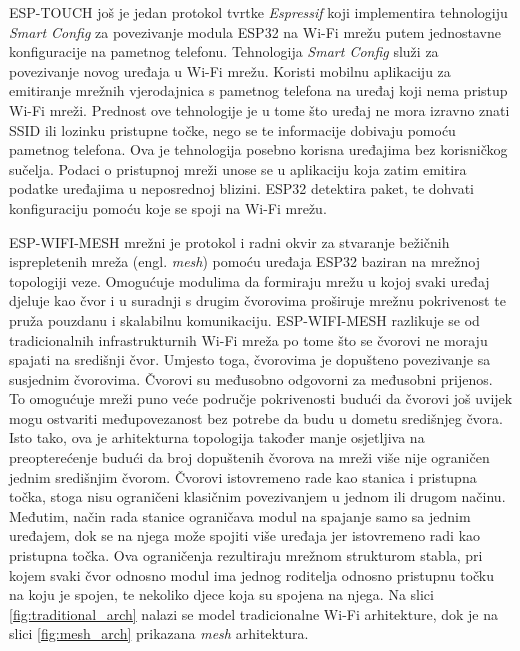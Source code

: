 ESP-TOUCH još je jedan protokol tvrtke \textit{Espressif} koji implementira tehnologiju \textit{Smart Config} za povezivanje modula ESP32 na Wi-Fi mrežu putem jednostavne konfiguracije na pametnog telefonu. Tehnologija \textit{Smart Config} služi za povezivanje novog uređaja u Wi-Fi mrežu. Koristi mobilnu aplikaciju za emitiranje mrežnih vjerodajnica s pametnog telefona na uređaj koji nema pristup Wi-Fi mreži. Prednost ove tehnologije je u tome što uređaj ne mora izravno znati SSID ili lozinku pristupne točke, nego se te informacije dobivaju pomoću pametnog telefona. Ova je tehnologija posebno korisna uređajima bez korisničkog sučelja. Podaci o pristupnoj mreži unose se u aplikaciju koja zatim emitira podatke uređajima u neposrednoj blizini. ESP32 detektira paket, te dohvati konfiguraciju pomoću koje se spoji na Wi-Fi mrežu.

ESP-WIFI-MESH mrežni je protokol i radni okvir za stvaranje bežičnih isprepletenih mreža (engl. \textit{mesh}) pomoću uređaja ESP32 baziran na mrežnoj topologiji veze. Omogućuje modulima da formiraju mrežu u kojoj svaki uređaj djeluje kao čvor i u suradnji s drugim čvorovima proširuje mrežnu pokrivenost te pruža pouzdanu i skalabilnu komunikaciju. ESP-WIFI-MESH razlikuje se od tradicionalnih infrastrukturnih Wi-Fi mreža po tome što se čvorovi ne moraju spajati na središnji čvor. Umjesto toga, čvorovima je dopušteno povezivanje sa susjednim čvorovima. Čvorovi su međusobno odgovorni za međusobni prijenos. To omogućuje mreži puno veće područje pokrivenosti budući da čvorovi još uvijek mogu ostvariti međupovezanost bez potrebe da budu u dometu središnjeg čvora. Isto tako, ova je arhitekturna topologija također manje osjetljiva na preopterećenje budući da broj dopuštenih čvorova na mreži više nije ograničen jednim središnjim čvorom. Čvorovi istovremeno rade kao stanica i pristupna točka, stoga nisu ograničeni klasičnim povezivanjem u jednom ili drugom načinu. Međutim, način rada stanice ograničava modul na spajanje samo sa jednim uređajem, dok se na njega može spojiti više uređaja jer istovremeno radi kao pristupna točka. Ova ograničenja rezultiraju mrežnom strukturom stabla, pri kojem svaki čvor odnosno modul ima jednog roditelja odnosno pristupnu točku na koju je spojen, te nekoliko djece koja su spojena na njega. Na slici \ref{fig:traditional_arch} nalazi se model tradicionalne Wi-Fi arhitekture, dok je na slici \ref{fig:mesh_arch} prikazana \textit{mesh} arhitektura. 

